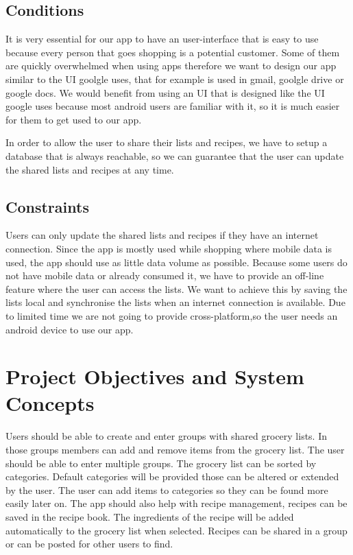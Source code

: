 \documentclass[12pt]{article}
\theoremstyle{definition}
\begin{document}
\subsection{Conditions}
It is very essential for our app to have an user-interface that is easy to use because every person that goes shopping is a potential customer. Some of them are quickly overwhelmed when using apps therefore we want to design our app similar to the UI goolgle uses, that for example  is used in  gmail, goolgle drive or google docs. We would benefit from using an UI that is designed like the UI google uses because most android users are familiar with it, so it is much easier for them to get used to our app.

In order to allow the user to share their lists and recipes, we have to setup a database that is always reachable, so we can guarantee that the user can update the shared lists and recipes at any time.

\subsection{Constraints}
Users can only update the shared lists and recipes if they have an internet connection. Since the app is mostly used while shopping where mobile data is used, the app should use as little data volume as possible. Because some users do not have mobile data or already consumed it, we have to provide an off-line feature where the user can access the lists. We want to achieve this by saving the lists local and synchronise the lists when an internet connection is available.
Due to limited time we are not going to provide cross-platform,so the user needs an android device to use our app.

\pagebreak

\section{Project Objectives and System Concepts}

Users should be able to create and enter groups with shared grocery lists. In those groups members can add and remove items from the grocery list. The user should be able to enter multiple groups. The grocery list can be sorted by categories. Default categories will be provided those can be altered or extended by the user. The user can add items to categories so they can be found more easily later on. The app should also help with recipe management, recipes can be saved in the recipe book. The ingredients of the recipe will be added automatically to the grocery list when selected. Recipes can be shared in a group or can be posted for other users to find. 
\end{document}
